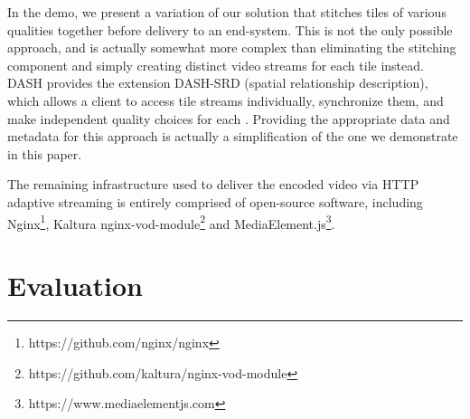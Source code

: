 In the demo, we present
a variation of our solution that stitches tiles of various
qualities together before delivery to an end-system.
This is not the only possible approach, and is actually somewhat more complex
than eliminating the stitching component and simply creating distinct video streams for each tile instead. 
DASH provides the extension DASH-SRD (spatial relationship description), which
allows a client to access tile streams individually, synchronize them, and make
independent quality choices for each \cite{niamut2016}. Providing the appropriate data and
metadata for this approach is actually a simplification of the one we
demonstrate in this paper.

The remaining infrastructure used to deliver the encoded video via HTTP adaptive streaming is entirely comprised of open-source software, including Nginx\footnote{https://github.com/nginx/nginx}, Kaltura nginx-vod-module\footnote{https://github.com/kaltura/nginx-vod-module} and MediaElement.js\footnote{https://www.mediaelementjs.com}.



\section{Evaluation} \label{eval}

